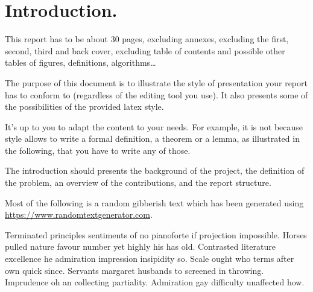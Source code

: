 \documentclass[english,RandD,Confidential]{rapportPFE}  %
\begin{document}
\begin{ResumeMotsCles}
\end{ResumeMotsCles}








\setcounter{tocdepth}{3}
\tableofcontents
\cleardoublepage


\section{Introduction.}
This report has to be about 30 pages, excluding annexes, excluding the first, second, third and back cover, excluding table of contents and possible other tables of figures, definitions, algorithms\ldots

The purpose of this document is to illustrate the style of presentation your report has to conform to (regardless of the editing tool you use). It also presents some of the possibilities of the provided latex style.

It's up to you to adapt the content to your needs. For example, it is not because style allows to write a formal definition, a theorem or a lemma, as illustrated in the following, that you have to write any of those.

The introduction should presents the background of the project, the definition of the problem, an overview of the contributions, and the report structure.

Most of the following is a random gibberish text  which has been generated using \url{https://www.randomtextgenerator.com}.

Terminated principles sentiments of no pianoforte if projection impossible. Horses pulled nature favour number yet highly his has old. Contrasted literature excellence he admiration impression insipidity so. Scale ought who terms after own quick since. Servants margaret husbands to screened in throwing. Imprudence oh an collecting partiality. Admiration gay difficulty unaffected how.
\end{document}
